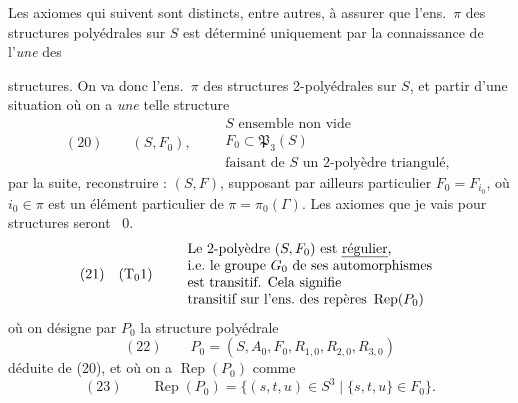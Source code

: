 \documentclass[11pt,a4paper]{article}
\begin{document}

Les axiomes qui suivent sont distincts, entre autres, à assurer que \struck{\ill{}} l'ens.\ $\pi$ des structures polyédrales sur $S$ est déterminé uniquement par la connaissance de l'\emph{une} des

structures. On va donc  \ill{} l'ens.\ $\pi$ des structures 2-polyédrales sur $S$, et  partir d'une situation où on a \emph{une} telle structure
\[
(20) \qquad (S, F_0), \qquad
\begin{array}{l}
S \text{ ensemble non vide} \\
F_0 \subset \mathfrak{P}_3(S) \\
\text{faisant de } S \text{ un 2-polyèdre triangulé,}
\end{array}
\]
par la suite, reconstruire : $(S, F)$,  supposant par ailleurs particulier $F_0 = F_{i_0}$, où $i_0 \in \pi$ est un élément particulier de $\pi = \pi_0(\Gamma)$. \struck{\ill{}} Les axiomes que je vais  pour  structures seront \struck{\ill{}}    ~$0$.
\[
(21) \quad (\text{T}_0 1) \qquad
\begin{array}{l}
\text{Le 2-polyèdre } (S, F_0) \text{ est \emph{régulier},} \\
\text{i.e.\ le groupe } G_0 \text{ de ses automorphismes} \\
\text{est transitif. Cela signifie} \\
\text{transitif sur l'ens.\ des repères } \operatorname{Rep}(P_0)
\end{array}
\]
où on désigne par $P_0$ la structure polyédrale
\[
(22) \qquad P_0 = (S, A_0, F_0, R_{1,0}, R_{2,0}, R_{3,0})
\]
déduite de (20), et où on a  $\operatorname{Rep}(P_0)$ comme
\[
(23) \qquad \operatorname{Rep}(P_0) = \{ (s, t, u) \in S^3 \mid \{s, t, u\} \in F_0 \} .
\]
\end{document}
